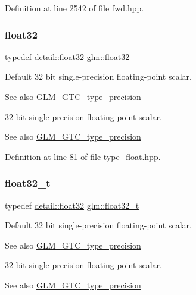 Definition at line 2542 of file fwd.\+hpp.

\mbox{\label{group__gtc__type__precision_ga814f2f65354b6588b067cc5c67a6b340}} 
\subsubsection{\texorpdfstring{float32}{float32}}
{\footnotesize\ttfamily typedef \hyperlink{namespaceglm_1_1detail_ad60558c5c304624de0b54c51b5857737}{detail\+::float32} \hyperlink{group__gtc__type__precision_ga814f2f65354b6588b067cc5c67a6b340}{glm\+::float32}}

Default 32 bit single-\/precision floating-\/point scalar. \begin{DoxySeeAlso}{See also}
\hyperlink{group__gtc__type__precision}{G\+L\+M\+\_\+\+G\+T\+C\+\_\+type\+\_\+precision}
\end{DoxySeeAlso}
32 bit single-\/precision floating-\/point scalar. \begin{DoxySeeAlso}{See also}
\hyperlink{group__gtc__type__precision}{G\+L\+M\+\_\+\+G\+T\+C\+\_\+type\+\_\+precision} 
\end{DoxySeeAlso}


Definition at line 81 of file type\+\_\+float.\+hpp.

\mbox{\label{group__gtc__type__precision_ga642737ae3e7c434b366f2191e6944bf2}} 
\subsubsection{\texorpdfstring{float32\+\_\+t}{float32\_t}}
{\footnotesize\ttfamily typedef \hyperlink{namespaceglm_1_1detail_ad60558c5c304624de0b54c51b5857737}{detail\+::float32} \hyperlink{group__gtc__type__precision_ga642737ae3e7c434b366f2191e6944bf2}{glm\+::float32\+\_\+t}}

Default 32 bit single-\/precision floating-\/point scalar. \begin{DoxySeeAlso}{See also}
\hyperlink{group__gtc__type__precision}{G\+L\+M\+\_\+\+G\+T\+C\+\_\+type\+\_\+precision}
\end{DoxySeeAlso}
32 bit single-\/precision floating-\/point scalar. \begin{DoxySeeAlso}{See also}
\hyperlink{group__gtc__type__precision}{G\+L\+M\+\_\+\+G\+T\+C\+\_\+type\+\_\+precision} 
\end{DoxySeeAlso}


